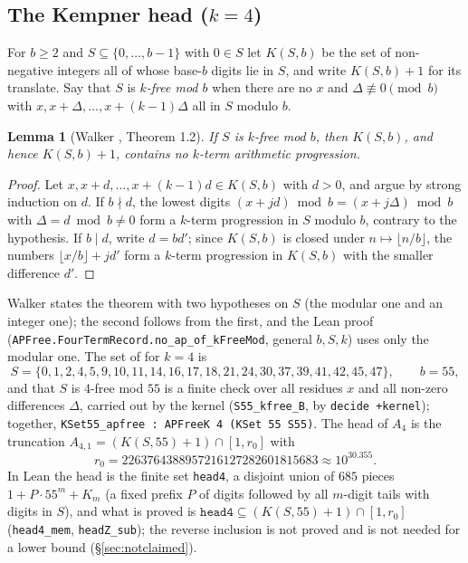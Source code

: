 \documentclass[11pt,a4paper]{article}
\newtheorem{lemma}[theorem]{Lemma}
\theoremstyle{definition}
\theoremstyle{remark}
\newcommand{\code}[1]{\texttt{#1}}
\begin{document}
\subsection{The Kempner head (\texorpdfstring{$k = 4$}{k = 4})}\label{sec:kempner}

For $b \ge 2$ and $S \subseteq \{0,\dots,b-1\}$ with $0 \in S$ let $K(S,b)$ be the set of non-negative integers all of whose base-$b$ digits lie in $S$, and write $K(S,b)+1$ for its translate. Say that $S$ is \emph{$k$-free mod $b$} when there are no $x$ and $\Delta \not\equiv 0 \pmod b$ with $x, x+\Delta, \dots, x+(k-1)\Delta$ all in $S$ modulo $b$.

\begin{lemma}[Walker \cite{Wa25}, Theorem 1.2]\label{lem:walker}
If $S$ is $k$-free mod $b$, then $K(S,b)$, and hence $K(S,b)+1$, contains no $k$-term arithmetic progression.
\end{lemma}

\begin{proof}
Let $x, x+d, \dots, x+(k-1)d \in K(S,b)$ with $d>0$, and argue by strong induction on $d$. If $b \nmid d$, the lowest digits $(x+jd) \bmod b = (x + j\Delta) \bmod b$ with $\Delta = d \bmod b \ne 0$ form a $k$-term progression in $S$ modulo $b$, contrary to the hypothesis. If $b \mid d$, write $d = bd'$; since $K(S,b)$ is closed under $n \mapsto \lfloor n/b \rfloor$, the numbers $\lfloor x/b \rfloor + jd'$ form a $k$-term progression in $K(S,b)$ with the smaller difference $d'$.
\end{proof}

Walker states the theorem with two hypotheses on $S$ (the modular one and an integer one); the second follows from the first, and the Lean proof (\code{APFree.\allowbreak{}FourTermRecord.\allowbreak{}no\_\allowbreak{}ap\_\allowbreak{}of\_\allowbreak{}kFreeMod}, general $b, S, k$) uses only the modular one. The set of \cite{Wa25} for $k=4$ is
\[
S = \{0,1,2,4,5,9,10,11,14,16,17,18,21,24,30,37,39,41,42,45,47\},\qquad b = 55,
\]
and that $S$ is 4-free mod $55$ is a finite check over all residues $x$ and all non-zero differences $\Delta$, carried out by the kernel (\code{S55\_\allowbreak{}kfree\_\allowbreak{}B}, by \code{decide +kernel}); together, \code{KSet55\_\allowbreak{}apfree : APFreeK 4 (KSet 55 S55)}. The head of $A_4$ is the truncation $A_{4,1} = (K(S,55)+1) \cap [1, r_0]$ with
\[
r_0 = 2263764388957216127282601815683 \approx 10^{30.355}.
\]
In Lean the head is the finite set \code{head4}, a disjoint union of $685$ pieces $1 + P\cdot 55^m + K_m$ (a fixed prefix $P$ of digits followed by all $m$-digit tails with digits in $S$), and what is proved is $\code{head4} \subseteq (K(S,55)+1) \cap [1, r_0]$ (\code{head4\_\allowbreak{}mem}, \code{headZ\_\allowbreak{}sub}); the reverse inclusion is not proved and is not needed for a lower bound (\S\ref{sec:notclaimed}).
\end{document}
